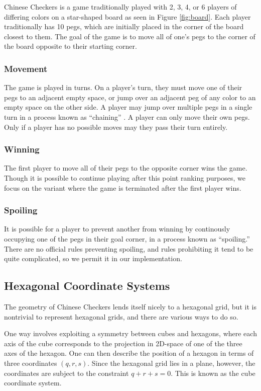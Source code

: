 \documentclass[12pt, a4paper, twocolumn]{article}
\begin{document}
Chinese Checkers is a game traditionally played with 2, 3, 4, or 6 players of differing colors on a star-shaped board as seen in Figure \ref{fig:board}. Each player traditionally has 10 pegs, which are initially placed in the corner of the board closest to them. The goal of the game is to move all of one's pegs to the corner of the board opposite to their starting corner.

\subsubsection{Movement}
The game is played in turns. On a player's turn, they must move one of their pegs to an adjacent empty space, or jump over an adjacent peg of any color to an empty space on the other side. A player may jump over multiple pegs in a single turn in a process known as ``chaining'' \cite{ChainingJumps}. A player can only move their own pegs. Only if a player has no possible moves may they pass their turn entirely.

\subsubsection{Winning}
The first player to move all of their pegs to the opposite corner wins the game. Though it is possible to continue playing after this point ranking purposes, we focus on the variant where the game is terminated after the first player wins.

\subsubsection{Spoiling}
It is possible for a player to prevent another from winning by continously occupying one of the pegs in their goal corner, in a process known as ``spoiling.'' \cite{ChineseCheckersSpoiling} There are no official rules preventing spoiling, and rules prohibiting it tend to be quite complicated, so we permit it in our implementation.

\subsection{Hexagonal Coordinate Systems}

The geometry of Chinese Checkers lends itself nicely to a hexagonal grid, but it is nontrivial to represent hexagonal grids, and there are various ways to do so. \cite{HexagonalCoordinates}

One way involves exploiting a symmetry between cubes and hexagons, where each axis of the cube corresponds to the projection in 2D-space of one of the three axes of the hexagon. One can then describe the position of a hexagon in terms of three coordinates $(q, r, s)$. Since the hexagonal grid lies in a plane, however, the coordinates are subject to the constraint $q + r + s = 0$. This is known as the cube coordinate system.
\end{document}
